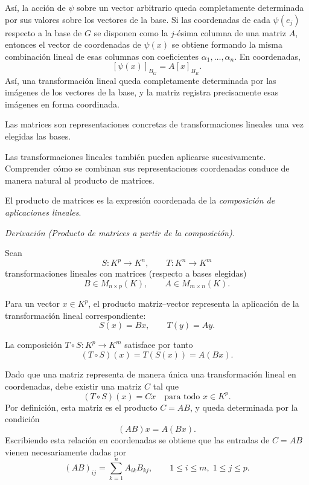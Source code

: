 Así, la acción de $\psi$ sobre un vector arbitrario queda completamente
determinada por sus valores sobre los vectores de la base.
Si las coordenadas de cada $\psi(e_j)$ respecto a la base de $G$
se disponen como la $j$-ésima columna de una matriz $A$, entonces el vector
de coordenadas de $\psi(x)$ se obtiene formando la misma combinación lineal
de esas columnas con coeficientes $\alpha_1,\dots,\alpha_n$.
En coordenadas,
\[
[\psi(x)]_{B_G}=A[x]_{B_E}.
\]
Así, una transformación lineal queda completamente determinada por las imágenes
de los vectores de la base, y la matriz registra precisamente esas imágenes
en forma coordinada.

\medskip

Las matrices son representaciones concretas de transformaciones lineales una vez elegidas las bases.

\medskip

Las transformaciones lineales también pueden aplicarse sucesivamente.
Comprender cómo se combinan sus representaciones coordenadas
conduce de manera natural al producto de matrices.

\medskip

El producto de matrices es la expresión coordenada de la \emph{composición de aplicaciones lineales}.

\medskip

\textit{Derivación (Producto de matrices a partir de la composición).}

\medskip

Sean
\[
S : K^p \longrightarrow K^n,
\qquad
T : K^n \longrightarrow K^m
\]
transformaciones lineales con matrices (respecto a bases elegidas)
\[
B \in M_{n\times p}(K),
\qquad
A \in M_{m\times n}(K).
\]

Para un vector $x \in K^p$, el producto matriz--vector representa
la aplicación de la transformación lineal correspondiente:
\[
S(x)=Bx,
\qquad
T(y)=Ay.
\]

La composición $T\circ S : K^p \to K^m$ satisface por tanto
\[
(T\circ S)(x)=T(S(x))=A(Bx).
\]

Dado que una matriz representa de manera única una transformación lineal en coordenadas,
debe existir una matriz $C$ tal que
\[
(T\circ S)(x)=Cx
\quad \text{para todo } x\in K^p.
\]
Por definición, esta matriz es el producto $C=AB$, y queda determinada por la condición
\[
(AB)x=A(Bx).
\]
Escribiendo esta relación en coordenadas se obtiene que las entradas de $C=AB$
vienen necesariamente dadas por
\[
(AB)_{ij}
=
\sum_{k=1}^{n} A_{ik} B_{kj},
\qquad
1\le i\le m,\; 1\le j\le p.
\]

